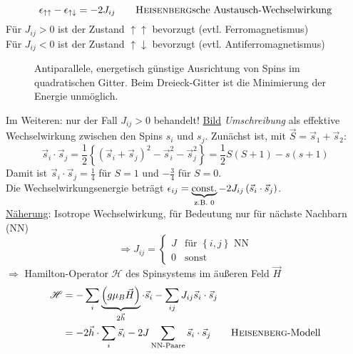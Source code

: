 \begin{equation}
    \epsilon_{\uparrow \uparrow} - \epsilon_{\uparrow \downarrow} = - 2 J_{ij} \qquad \text{\textsc{Heisenberg}sche Austausch-Wechselwirkung}
\end{equation}
Für $J_{ij} > 0$ ist der Zustand $\uparrow \uparrow$ bevorzugt (evtl. Ferromagnetismus) \\
Für $J_{ij} < 0$ ist der Zustand $\uparrow \downarrow$ bevorzugt (evtl. Antiferromagnetismus)
\begin{figure}[H]
    \centering
    \def\svgwidth{0.6\textwidth}
    
    \caption{Antiparallele, energetisch günstige Ausrichtung von Spins im quadratischen Gitter.
    Beim Dreieck-Gitter ist die Minimierung der Energie unmöglich.}
    \label{img:Frustration}
\end{figure}
Im Weiteren: nur der Fall $J_{ij} > 0$ behandelt!
\underline{Bild} \emph{Umschreibung} als effektive Wechselwirkung zwischen den Spins $s_i$ und $s_j$. Zunächst ist,
mit $\vec{S} = \vec{s}_1 + \vec{s}_2$:
\begin{equation}
    \vec{s}_i \cdot \vec{s}_j = \frac{1}{2} \left\{ \left( \vec{s}_i + \vec{s}_j \right)^2 - \vec{s}_i^2 - \vec{s}_j^2  \right\} = \frac{1}{2} S (S + 1) - s(s+1)
\end{equation}
Damit ist $\vec{s}_i \cdot \vec{s}_j = \frac{1}{4} $ für $S = 1$ und $-\frac{3}{4}$ für $S = 0$. \\
Die Wechselwirkungsenergie beträgt $\epsilon_{ij} = \underbrace{\text{const.}}_{\text{z.B. } 0} - 2 J_{ij} \left( \vec{s}_i \cdot \vec{s}_j  \right) $.\\
\underline{Näherung}: Isotrope Wechselwirkung, für Bedeutung nur für nächste Nachbarn (NN)
\begin{equation}
    \Rightarrow J_{ij} =
    \begin{cases}
        J & \text{für } \left\{ i, j \right\} \text{ NN} \\
        0 & \text{sonst}
    \end{cases}
\end{equation}
$\Rightarrow$ Hamilton-Operator $\mathscr{H}$ des Spinsystems im äußeren Feld $\vec{H}$
\begin{equation}
    \begin{split}
        \mathscr{H} &= - \sum_i \underbrace{\left( g \mu_B \vec{H} \right)}_{2 \vec{h}} \cdot \vec{s}_i - \sum_{ij} J_{ij} \vec{s}_i \cdot \vec{s}_j \\
        &= - 2 \vec{h} \cdot \sum_i \vec{s}_i - 2 J \sum_{\text{NN-Paare}} \vec{s}_i \cdot \vec{s}_j \qquad \text{\textsc{Heisenberg}-Modell}
    \end{split}
\end{equation}
